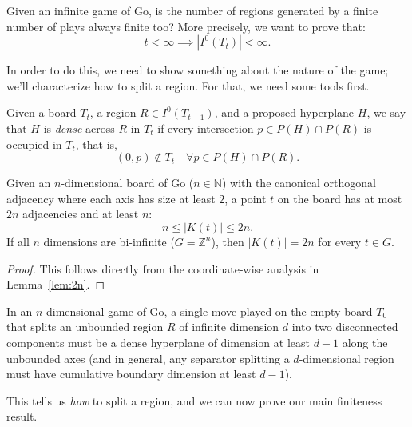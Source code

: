 Given an infinite game of Go, is the number of regions generated by a finite number of plays always finite too?
More precisely, we want to prove that:
$$t < \infty \implies |I^0(T_t)|<\infty.$$

In order to do this, we need to show something about the nature of the game; we'll characterize how to split a region. For that, we need some tools first.

\begin{definition}
	Given a board $T_t$, a region $R \in I^0(T_{t-1})$, and a proposed hyperplane $H$, we say that $H$ is \emph{dense} across $R$ in $T_t$
	if every intersection $p \in P(H) \cap P(R)$ is occupied in $T_t$, that is,
	$$(0, p) \notin T_t \quad \forall p \in P(H) \cap P(R).$$
\end{definition}

\begin{lemma}\label{lem_2n}
	Given an $n$-dimensional board of Go ($n \in \mathbb{N}$) with the canonical orthogonal adjacency where each axis has size at least $2$, a point $t$ on the board has at most $2n$ adjacencies and at least $n$:
	$$n \leq |K(t)| \leq 2n.$$
	If all $n$ dimensions are bi-infinite ($G = \mathbb{Z}^n$), then $|K(t)| = 2n$ for every $t \in G$.
\end{lemma}
\begin{proof}
	This follows directly from the coordinate-wise analysis in Lemma~\ref{lem:2n}.
\end{proof}








\begin{theorem}\label{lem_bigplays}
	In an $n$-dimensional game of Go, a single move played on the empty board $T_0$ that splits an unbounded region $R$ of infinite dimension $d$ into two disconnected components must be a dense hyperplane of dimension at least $d-1$ along the unbounded axes (and in general, any separator splitting a $d$-dimensional region must have cumulative boundary dimension at least $d-1$).
\end{theorem}
This tells us \textit{how} to split a region, and we can now prove our main finiteness result.

